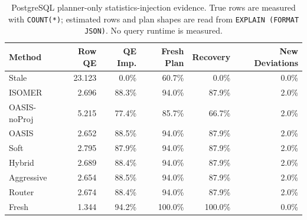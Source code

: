 \begin{table}[t]
  \centering
  \small
  \caption{PostgreSQL planner-only statistics-injection evidence. True rows are measured with \texttt{COUNT(*)}; estimated rows and plan shapes are read from \texttt{EXPLAIN (FORMAT JSON)}. No query runtime is measured.}
  \label{tab:postgres_planner_stats_injection}
  \setlength{\tabcolsep}{4pt}
  \begin{tabular}{lrrrrr}
    \toprule
    Method & Row QE & QE Imp. & Fresh Plan & Recovery & New Deviations \\
    \midrule
    Stale & 23.123 & 0.0\% & 60.7\% & 0.0\% & 0.0\% \\
    ISOMER & 2.696 & 88.3\% & 94.0\% & 87.9\% & 2.0\% \\
    OASIS-noProj & 5.215 & 77.4\% & 85.7\% & 66.7\% & 2.0\% \\
    OASIS & 2.652 & 88.5\% & 94.0\% & 87.9\% & 2.0\% \\
    Soft & 2.795 & 87.9\% & 94.0\% & 87.9\% & 2.0\% \\
    Hybrid & 2.689 & 88.4\% & 94.0\% & 87.9\% & 2.0\% \\
    Aggressive & 2.654 & 88.5\% & 94.0\% & 87.9\% & 2.0\% \\
    Router & 2.674 & 88.4\% & 94.0\% & 87.9\% & 2.0\% \\
    Fresh & 1.344 & 94.2\% & 100.0\% & 100.0\% & 0.0\% \\
    \bottomrule
  \end{tabular}
\end{table}
